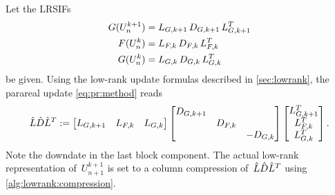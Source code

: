 Let the \acp{LRSIF}
\begin{equation}
\begin{aligned}
  G(U^{k+1}_n) &= \mathop{L_{G,k+1}} \mathop{D_{G,k+1}} \mathop{L_{G,k+1}^T} \\
  F(U^k_n)     &= \mathop{L_{F,k}}   \mathop{D_{F,k}}   \mathop{L_{F,k}^T} \\
  G(U^k_n)     &= \mathop{L_{G,k}}   \mathop{D_{G,k}}   \mathop{L_{G,k}^T}
\end{aligned}
\end{equation}
be given.
Using the low-rank update formulas described in \autoref{sec:lowrank},
the parareal update \eqref{eq:pr:method} reads
\begin{equation}
  \hat L \hat D \hat L^T :=
  \begin{bmatrix}
    L_{G,k+1} &
    L_{F,k} &
    L_{G,k}
  \end{bmatrix}
  \begin{bmatrix}
    D_{G,k+1} \\
    & D_{F,k} \\
    && -D_{G,k}
  \end{bmatrix}
  \begin{bmatrix}
    L_{G,k+1}^T \\
    L_{F,k}^T \\
    L_{G,k}^T
  \end{bmatrix}
  .
\end{equation}
Note the downdate in the last block component.
The actual low-rank representation of~$U^{k+1}_{n+1}$ is set to a column compression of~$\hat L \hat D \hat L^T$
using \autoref{alg:lowrank:compression}.

